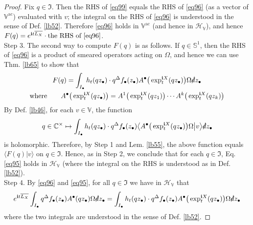 \documentclass[12pt,b5paper,notitlepage]{article}
\theoremstyle{definition}
\theoremstyle{plain}
\newcommand{\fk}{\mathfrak}
\newcommand{\ovl}{\overline}
\newcommand{\bk}[1]{\langle {#1}\rangle}
\newcommand{\bigbk}[1]{\big\langle {#1}\big\rangle}
\newcommand{\im}{\mathbf{i}}
\newcommand{\blt}{\bullet}
\newcommand{\Vbb}{\mathbb V}
\newcommand{\Cbb}{\mathbb C}
\newcommand{\Sbb}{{\mathbb S}}
\newcommand{\HV}{\mathcal H_{\mathbb V}}
\newcommand{\sd}{\slashed{d}}
\newcommand{\ac}{\mathrm{ac}}
\numberwithin{equation}{section}
\begin{document}
\begin{proof}
Fix $q\in\fk I$.  Then the RHS of \eqref{eq99} equals the RHS of \eqref{eq96} (as a vector of $\Vbb^\ac$) evaluated with $v$; the integral on the RHS of \eqref{eq96} is understood in the sense of Def. \ref{lb52}.  Therefore  \eqref{eq96} holds in $\Vbb^\ac$ (and hence in $\HV$), and hence
$F(q)=e^{\im t\ovl{L_X}}\cdot \text{the RHS of }\eqref{eq96}$.\\[-1ex]

Step 3. The second way to compute $F(q)$ is as follows. If $q\in\Sbb^1$, then the RHS of \eqref{eq96} is a product of smeared operators acting on $\Omega$, and hence we can use Thm. \ref{lb65} to show that
\begin{gather}
F(q)=\int_{I_\blt}h_t(qz_\blt)\cdot  q^\Delta f_\blt(z_\blt)A^\blt\big(\exp_t^{\im X}(qz_\blt)\big)\Omega\sd z_\blt\label{eq95}\\
\text{where}\qquad A^\blt\big(\exp_t^{\im X}(q z_\blt)\big)=A^1\big(\exp_t^{\im X}(qz_1)\big)\cdots A^k\big(\exp_t^{\im X}(qz_k)\big)\nonumber
\end{gather}
By Def. \ref{lb46}, for each $v\in\Vbb$, the function
\begin{align*}
q\in\Cbb^\times\mapsto \int_{I_\blt}h_t(qz_\blt)\cdot  q^\Delta f_\blt(z_\blt)\bigbk{A^\blt\big(\exp_t^{\im X}(qz_\blt)\big)\Omega\big|v}\sd z_\blt
\end{align*}
is holomorphic. Therefore, by Step 1 and Lem. \ref{lb55}, the above function equals $\bk{F(q)|v}$ on $q\in\fk I$. Hence, as in Step 2, we conclude that for each $q\in\fk I$, Eq. \eqref{eq95} holds in $\HV$ (where the integral on the RHS is understood as in Def. \ref{lb52}).\\[-1ex]

Step 4. By \eqref{eq96} and \eqref{eq95}, for all $q\in\fk I$ we have in $\HV$ that
\begin{align}\label{eq97}
e^{\im t\ovl{L_X}}\int_{I_\blt} q^\Delta f_\blt(z_\blt)A^\blt(qz_\blt)\Omega\sd z_\blt=\int_{I_\blt}h_t(qz_\blt)\cdot  q^\Delta f_\blt(z_\blt)A^\blt\big(\exp_t^{\im X}(qz_\blt)\big)\Omega\sd z_\blt
\end{align}
where the two integrals are understood in the sense of Def. \ref{lb52}. 


\end{proof}
\end{document}

